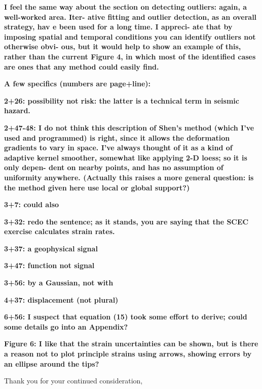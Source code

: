 \documentclass[10pt,a4paper]{letter}
\begin{document}
\begin{letter}{}
\textbf{I feel the same way about the section on detecting outliers: again, a
well-worked area. Iter- ative fitting and outlier detection, as an
overall strategy, hav e been used for a long time. I appreci- ate that
by imposing spatial and temporal conditions you can identify outliers
not otherwise obvi- ous, but it would help to show an example of this,
rather than the current Figure 4, in which most of the identified
cases are ones that any method could easily find.}

\textbf{A few specifics (numbers are page+line):}

\textbf{2+26: possibility not risk: the latter is a technical term in seismic
hazard.}

\textbf{2+47-48: I do not think this description of Shen’s method (which I’ve
used and programmed) is right, since it allows the deformation
gradients to vary in space. I’ve always thought of it as a kind of
adaptive kernel smoother, somewhat like applying 2-D loess; so it is
only depen- dent on nearby points, and has no assumption of uniformity
anywhere. (Actually this raises a more general question: is the method
given here use local or global support?)}

\textbf{3+7: could also}

\textbf{3+32: redo the sentence; as it stands, you are saying that the SCEC
exercise calculates strain rates.}

\textbf{3+37: a geophysical signal}

\textbf{3+47: function not signal}

\textbf{3+56: by a Gaussian, not with}

\textbf{4+37: displacement (not plural)}

\textbf{6+56: I suspect that equation (15) took some effort to derive; could
some details go into an Appendix?}

\textbf{Figure 6: I like that the strain uncertainties can be shown, but is
there a reason not to plot principle strains using arrows, showing
errors by an ellipse around the tips?}

\closing{Thank you for your continued consideration,}

\end{letter}
\end{document}
